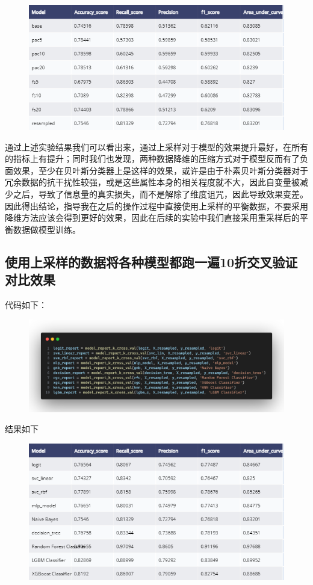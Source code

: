 \documentclass{article}
\begin{document}
\begin{figure}[H]
	\centering
	\includegraphics[width=\textwidth]{./img/gnb_pre.png}
\end{figure}

通过上述实验结果我们可以看出来，通过上采样对于模型的效果提升最好，在所有的指标上有提升；同时我们也发现，两种数据降维的压缩方式对于模型反而有了负面效果，至少在贝叶斯分类器上是这样的效果，或许是由于朴素贝叶斯分类器对于冗余数据的抗干扰性较强，或是这些属性本身的相关程度就不大，因此自变量被减少之后，导致了信息量的真实损失，而不是解除了维度诅咒，因此导致效果变差。
因此得出结论，指导我在之后的操作过程中直接使用上采样的平衡数据，不要采用降维方法应该会得到更好的效果，因此在后续的实验中我们直接采用重采样后的平衡数据做模型训练。

\subsection{使用上采样的数据将各种模型都跑一遍10折交叉验证对比效果}
代码如下：
\begin{figure}[H]
	\centering
	\includegraphics[width=\textwidth]{./img/test_all_models.png}
\end{figure}

结果如下
\begin{figure}[H]
	\centering
	\includegraphics[width=\textwidth]{./img/all_models_res.png}
\end{figure}
\end{document}
